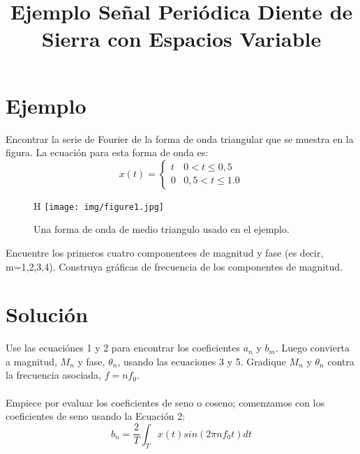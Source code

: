 \documentclass[12pt]{article}
\title{\textbf{Ejemplo Señal Periódica Diente de Sierra con Espacios Variable}}
\begin{document}
    \maketitle
    \section*{Ejemplo}
        Encontrar la serie de Fourier de la forma de onda triangular que se muestra  
        en la figura. La ecuación para esta forma de onda es:
        \begin{equation*}
            x(t)=\begin{cases}
                t & 0 < t \leq 0,5 \\
                0 & 0,5 < t \leq 1.0                
            \end{cases}
        \end{equation*}
        \begin{figure*}{H}
            \centering
            \texttt{[image: img/figure1.jpg]}
            \caption{Una forma de onda de medio triangulo usado en el ejemplo.}
        \end{figure*}
        Encuentre los primeros cuatro componentees de magnitud y fase (es decir, m=1,2,3,4).
        Construya gráficas de frecuencia de los componentes de magnitud.\\
    \section*{Solución}
        Use las ecuaciónes 1 y 2 para encontrar los coeficientes $a_{n}$ y $b_{m}$. Luego 
        convierta a magnitud, $M_{n}$ y fase, $\theta_{n}$, usando las ecuaciones 3 y 5. 
        Gradique $M_{n}$ y $\theta_{n}$ contra la frecuencia asociada, $f=nf_{0}$.\\
        \\
        Empiece por evaluar los coeficientes de seno o coseno; comenzamos con los 
        coeficientes de seno usando la Ecuación 2:
        \begin{equation*}
            b_{n}=\frac{2}{T} \int_{T} x(t)sin(2\pi nf_{0}t)dt
        \end{equation*}
\end{document}
